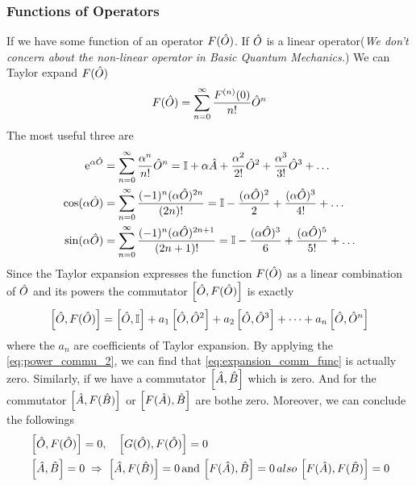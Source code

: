 \subsubsection{Functions of Operators}
If we have some function of an operator $F(\hat{O})$. If $\hat{O}$ is a linear operator(\emph{We don't concern about the non-linear operator in Basic Quantum Mechanics.}) We can Taylor expand $F(\hat{O})$
\begin{eqnarray}
    F(\hat{O}) = \sum_{n=0}^{\infty} \frac{F^{(n)}(0)}{n!}\hat{O}^n
\end{eqnarray}
The most useful three are 
\begin{align}
    \mathrm{e}^{\alpha \hat{O}} &= \sum_{n=0}^{\infty} \frac{\alpha^n}{n!} \hat{O}^n = \mathbb{I} + \alpha \hat{A} + \frac{\alpha^2}{2!} \hat{O}^2 + \frac{\alpha^3}{3!} \hat{O}^3 + \dots \label{eq:expansion_exponential} \\
    \cos (\alpha \hat{O}) &= \sum_{n=0}^{\infty} \frac{(-1)^n(\alpha \hat{O})^{2 n}}{(2 n)!} = \mathbb{I} - \frac{(\alpha \hat{O})^2}{2} + \frac{(\alpha \hat{O})^3}{4!} +\dots \label{eq:expansion_cos} \\
    \sin (\alpha \hat{O}) &= \sum_{n=0}^{\infty} \frac{(-1)^{n}(\alpha \hat{O})^{2n+1}}{(2n+1)!} = \mathbb{I} - \frac{(\alpha \hat{O})^3}{6} + \frac{(\alpha \hat{O})^5}{5!} + \dots \label{eq:expansion_sin}
\end{align}
Since the Taylor expansion expresses the function $F(\hat{O})$ as a linear combination of $\hat{O}$ and its powers the commutator $\left[ \hat{O} , F(\hat{O}) \right]$ is exactly 
\begin{eqnarray}
    \left[ \hat{O} , F(\hat{O}) \right] = \left[ \hat{O} , \mathbb{I} \right] + a_1 \left[ \hat{O} , \hat{O}^2 \right] + a_2 \left[ \hat{O} , \hat{O}^3 \right] + \dots + a_n \left[ \hat{O} , \hat{O}^n \right] \label{eq:expansion_comm_func}
\end{eqnarray}
where the $a_n$ are coefficients of Taylor expansion. By applying the \cref{eq:power_commu_2}, we can find that \cref{eq:expansion_comm_func} is actually zero. Similarly, if we have a commutator $\left[ \hat{A} , \hat{B} \right] $ which is zero. And for the commutator $\left[ \hat{A} , F(\hat{B}) \right]$ or $\left[ F(\hat{A}) , \hat{B} \right]$ are bothe zero. Moreover, we can conclude the followings 
\begin{align}
    &\left[ \hat{O} , F(\hat{O}) \right] = 0, \quad \left[ G(\hat{O}) , F(\hat{O}) \right] =0  \\
    &\left[ \hat{A} , \hat{B} \right] = 0 \;\Rightarrow \; \left[ \hat{A} , F(\hat{B}) \right] =0 \,\text{and} \,\left[ F(\hat{A}) , \hat{B} \right] = 0 \, also \, \left[ F(\hat{A}) , F(\hat{B}) \right] = 0
\end{align}

